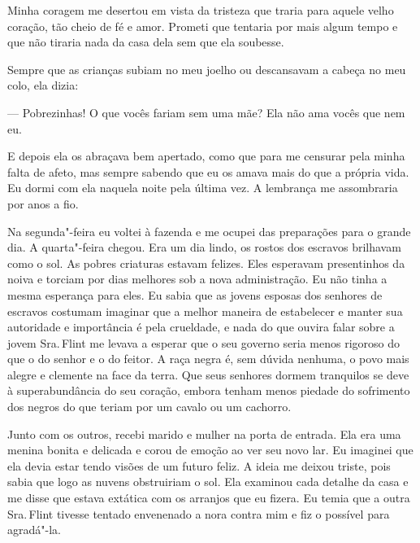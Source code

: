 Minha coragem me desertou em vista da
tristeza que traria para aquele velho coração, tão cheio de fé e amor.
Prometi que tentaria por mais algum tempo e que não tiraria nada da casa
dela sem que ela soubesse.

Sempre que as crianças subiam no meu
joelho ou descansavam a cabeça no meu colo, ela dizia:

--- Pobrezinhas! O que vocês fariam sem uma mãe? Ela não ama vocês que
nem eu.

E depois ela os abraçava bem apertado, como que para me censurar pela
minha falta de afeto, mas sempre sabendo que eu os amava mais do que a
própria vida. Eu dormi com ela naquela noite pela última vez. A
lembrança me assombraria por anos a fio.

Na segunda"-feira eu voltei à fazenda e
me ocupei das preparações para o grande dia. A quarta"-feira chegou. Era
um dia lindo, os rostos dos escravos brilhavam como o sol. As pobres
criaturas estavam felizes. Eles esperavam presentinhos da noiva e
torciam por dias melhores sob a nova administração. Eu não tinha a mesma
esperança para eles. Eu sabia que as jovens esposas dos senhores de
escravos costumam imaginar que a melhor maneira de estabelecer e manter
sua autoridade e importância é pela crueldade, e nada do que ouvira
falar sobre a jovem Sra.\,Flint me levava a esperar que o seu governo
seria menos rigoroso do que o do senhor e o do feitor. A raça negra é,
sem dúvida nenhuma, o povo mais alegre e clemente na face da terra. Que
seus senhores dormem tranquilos se deve à superabundância do seu
coração, embora tenham menos piedade do sofrimento dos negros do que
teriam por um cavalo ou um cachorro.

Junto com os outros, recebi marido e
mulher na porta de entrada. Ela era uma menina bonita e delicada e corou
de emoção ao ver seu novo lar. Eu imaginei que ela devia estar tendo
visões de um futuro feliz. A ideia me deixou triste, pois sabia que logo
as nuvens obstruiriam o sol. Ela examinou cada detalhe da casa e me
disse que estava extática com os arranjos que eu fizera. Eu temia que a
outra Sra.\,Flint tivesse tentado envenenado a nora contra mim e fiz o
possível para agradá"-la.

